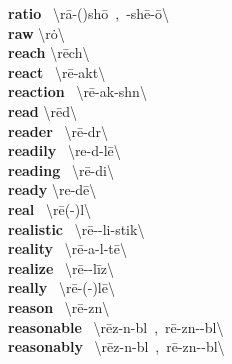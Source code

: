 \documentclass[10pt,a4paper]{article}
\begin{document}
\begin{multicols}{2}
\textbf{ ratio }\quad \ \textbackslash \textprimstress r\={a}-(\textsecstress )sh\={o}\ ,\ -sh\={e}-\textsecstress \={o}\textbackslash \\
\textbf{ raw }\quad \textbackslash \textprimstress r\.{o}\textbackslash \\
\textbf{ reach }\quad \textbackslash \textprimstress r\={e}ch\textbackslash \\
\textbf{ react }\quad \ \textbackslash r\={e}-\textprimstress akt\textbackslash \\
\textbf{ reaction }\quad \ \textbackslash r\={e}-\textprimstress ak-sh\textschwa n\textbackslash \\
\textbf{ read }\quad \textbackslash \textprimstress r\={e}d\textbackslash \\
\textbf{ reader }\quad \ \textbackslash \textprimstress r\={e}-d\textschwa r\textbackslash \\
\textbf{ readily }\quad \ \textbackslash \textprimstress re-d\textschwa -l\={e}\textbackslash \\
\textbf{ reading }\quad \ \textbackslash \textprimstress r\={e}-di\engma \textbackslash \\
\textbf{ ready }\quad \textbackslash \textprimstress re-d\={e}\textbackslash \\
\textbf{ real }\quad \ \textbackslash \textprimstress r\={e}(-\textschwa )l\textbackslash \\
\textbf{ realistic }\quad \ \textbackslash \textsecstress r\={e}-\textschwa -\textprimstress li-stik\textbackslash \\
\textbf{ reality }\quad \ \textbackslash r\={e}-\textprimstress a-l\textschwa -t\={e}\textbackslash \\
\textbf{ realize }\quad \ \textbackslash \textprimstress r\={e}-\textschwa -\textsecstress l\={i}z\textbackslash \\
\textbf{ really }\quad \ \textbackslash \textprimstress r\={e}-(\textschwa -)l\={e}\textbackslash \\
\textbf{ reason }\quad \ \textbackslash \textprimstress r\={e}-z\textsuperscript{\textreve}n\textbackslash \\
\textbf{ reasonable }\quad \ \textbackslash \textprimstress r\={e}z-n\textschwa -b\textschwa l\ ,\ \textprimstress r\={e}-z\textsuperscript{\textreve}n-\textschwa -b\textschwa l\textbackslash \\
\textbf{ reasonably }\quad \ \textbackslash \textprimstress r\={e}z-n\textschwa -b\textschwa l\ ,\ \textprimstress r\={e}-z\textsuperscript{\textreve}n-\textschwa -b\textschwa l\textbackslash \\

\end{multicols}
\end{document}

